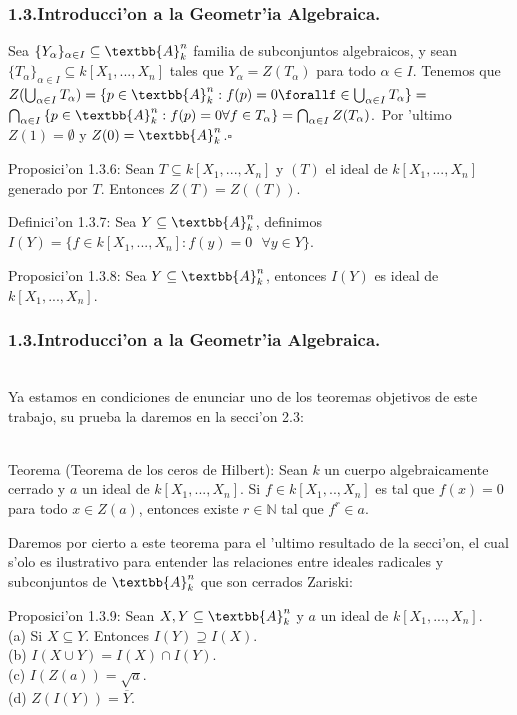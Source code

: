 \documentclass[10pt]{beamer}
\renewcommand{\A}{\textbb{A}_{k}^n}
\renewcommand{\N}{\mathbb{N}}
\renewcommand{\a}{\alpha}
\begin{document}
\begin{frame}
\frametitle{1.3.Introducci'on a la Geometr'ia Algebraica.}
\begin{block}{}
Sea $\{Y_{\a}\}_{\a \in I} \subseteq \A$ familia de subconjuntos algebraicos, y sean $\{T_{\a}\}_{\a \in I} \subseteq k[X_1,...,X_n]$ tales que $Y_{\a}=Z(T_{\a})$ para todo $\a \in I$. Tenemos que\\

$Z(\bigcup _{\a \in I}{T_{\a}}) = \{p\in \A:f(p)=0\forallf\in\bigcup _{\a\in I} {T_{\a}}\}=$\\
$ \bigcap _{\a \in I} {\{ p \in \A : f(p)=0 \forall f \in T_{\a} \}}= \bigcap _{\a \in I}{Z(T_{\a})}$.\
Por 'ultimo $Z(1)=\emptyset$ y $Z(0)=\A$.\hfill $\square$\\
\end{block}
\begin{block}{Proposici'on 1.3.6:} 
Sean $T\subseteq k[X_1,...,X_n]$ y $(T)$ el ideal de $k[X_1,...,X_n]$ generado por $T$. Entonces $Z(T)=Z((T))$.\\
\end{block}
\begin{block}{Definici'on 1.3.7:} 
Sea $Y \subseteq \A$, definimos $I(Y)=\{f \in k[X_1,...,X_n]:f(y)=0\text{ } \forall y \in Y \}$.\\
\end{block}
\begin{block}{Proposici'on 1.3.8:}
Sea $Y \subseteq \A$, entonces $I(Y)$ es ideal de $k[X_1,...,X_n]$.\\
\end{block}
\end{frame}



\begin{frame}
\frametitle{1.3.Introducci'on a la Geometr'ia Algebraica.}
\\
Ya estamos en condiciones de enunciar uno de los teoremas objetivos de este trabajo, su prueba la daremos en la secci'on 2.3:\\
\\
\begin{block}{Teorema (Teorema de los ceros de Hilbert):} 
Sean $k$ un cuerpo algebraicamente cerrado y $a$ un ideal de $k[X_1,...,X_n]$. Si $f \in k[X_1,..,X_n]$ es tal que $f(x)=0$ para todo $x \in Z(a)$, entonces existe $r \in \N$ tal que $f^{r} \in a$.\\
\end{block}
Daremos por cierto a este teorema para el 'ultimo resultado de la secci'on, el cual s'olo es ilustrativo para entender las relaciones entre ideales radicales y subconjuntos de $\A$ que son cerrados Zariski:\\
\begin{block}{Proposici'on 1.3.9:} 
Sean $X,Y \subseteq \A$ y $a$ un ideal de $k[X_1,...,X_n]$.\\
(a) Si $X \subseteq Y$. Entonces $I(Y)\supseteq I(X)$.\\
(b) $I(X\cup Y)=I(X)\cap I(Y)$.\\
(c) $I(Z(a))=\sqrt{a}$.\\
(d) $Z(I(Y))=\overline{Y}$.\\
\end{block}
\end{frame}
\end{document}
